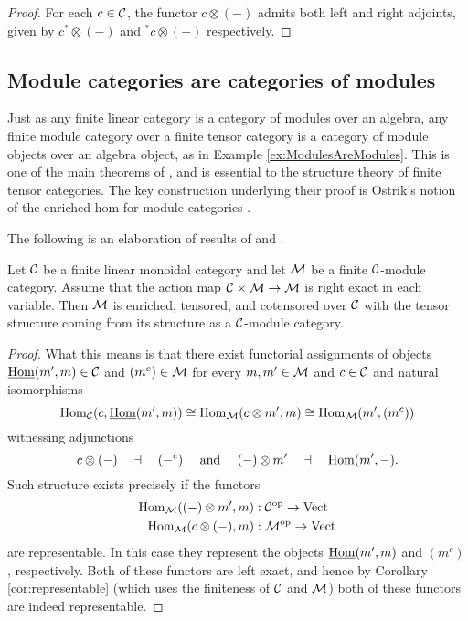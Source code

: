 \documentclass{amsart}
\begin{document}
\begin{proof}
	For each $c \in \mathcal C$, the functor $c \otimes (-)$ admits both left and right adjoints, given by $c^* \otimes (-)$ and ${}^*c \otimes (-)$ respectively. 
\end{proof}



\subsection{Module categories are categories of modules}


Just as any finite linear category is a category of modules over an algebra, any finite module category over a finite tensor category is a category of module objects over an algebra object, as in Example \ref{ex:ModulesAreModules}.  This is one of the main theorems of \cite{EGNO}, and is essential to the structure theory of finite tensor categories.  The key construction underlying their proof is Ostrik's notion of the enriched hom for module categories \cite{MR1976459}.  

The following is an elaboration of results of \cite{MR1976459} and \cite{EO-ftc}. %
\begin{proposition} \label{thm:enrichment-of-mod-cats}
	Let $\mathcal C$ be a finite linear monoidal category and let $\mathcal M$ be a finite $\mathcal C$-module category. Assume that the action map $\mathcal C \times \mathcal M \to \mathcal M$ is right exact in each variable. 
		Then $\mathcal M$ is enriched, tensored, and cotensored over $\mathcal C$ with the tensor structure coming from its structure as a $\mathcal C$-module category. 
\end{proposition}

\begin{proof}
	What this means is that there exist functorial assignments of objects $\operatorname{\underline{Hom}}(m', m) \in \mathcal C$ and $(m^c) \in \mathcal M$ for every $m,m' \in \mathcal M$ and $c \in \mathcal C$ and natural isomorphisms
	\begin{equation*}
		\operatorname{Hom}_\mathcal C(c, \operatorname{\underline{Hom}}(m', m)) \cong \operatorname{Hom}_\mathcal M(c \otimes m', m) \cong \operatorname{Hom}_\mathcal M( m', (m^c))
	\end{equation*}
	witnessing adjunctions
	\begin{equation*}
			c \otimes (-) \quad \dashv\quad (-^c) \quad \textrm{ and } \quad (-) \otimes m' \quad \dashv \quad \operatorname{\underline{Hom}}(m', -).
	\end{equation*}
Such structure exists precisely if the functors
\begin{align*}
	\operatorname{Hom}_\mathcal M((-)\otimes m', m): \; & \mathcal C^{\mathrm{op}} \to \mathrm{Vect} \\
	\operatorname{Hom}_\mathcal M(c \otimes (-), m): \; & \mathcal M^{\mathrm{op}} \to \mathrm{Vect}
\end{align*}
are representable. In this case they represent the objects $\operatorname{\underline{Hom}}(m', m)$ and $(m^c)$, respectively. Both of these functors are left exact, and hence by Corollary \ref{cor:representable} (which uses the finiteness of $\mathcal C$ and $\mathcal M$) both of these functors are indeed representable.  %
\end{proof}
\end{document}
